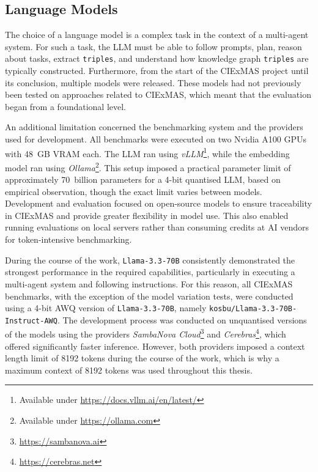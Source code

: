 \documentclass[a4paper,oneside,bibliography=totoc]{scrbook}
\begin{document}
\subsection{Language Models}
\label{subsec:eval_language_models}

The choice of a language model is a complex task in the context of a multi-agent system. For such a task, the \ac{LLM} must be able to follow prompts, plan, reason about tasks, extract \texttt{triples}, and understand how knowledge graph \texttt{triples} are typically constructed. Furthermore, from the start of the CIExMAS project until its conclusion, multiple models were released. These models had not previously been tested on approaches related to CIExMAS, which meant that the evaluation began from a foundational level.

An additional limitation concerned the benchmarking system and the providers used for development. All benchmarks were executed on two Nvidia A100 GPUs with 48~GB VRAM each. The \ac{LLM} ran using \textit{vLLM}\footnote{Available under \url{https://docs.vllm.ai/en/latest/}}, while the embedding model ran using \textit{Ollama}\footnote{Available under \url{https://ollama.com}}. This setup imposed a practical parameter limit of approximately 70~billion parameters for a 4-bit quantised \ac{LLM}, based on empirical observation, though the exact limit varies between models. Development and evaluation focused on open-source models to ensure traceability in CIExMAS and provide greater flexibility in model use. This also enabled running evaluations on local servers rather than consuming credits at AI vendors for token-intensive benchmarking.

During the course of the work, \texttt{Llama-3.3-70B} consistently demonstrated the strongest performance in the required capabilities, particularly in executing a multi-agent system and following instructions. For this reason, all CIExMAS benchmarks, with the exception of the model variation tests, were conducted using a 4-bit AWQ version of \texttt{Llama-3.3-70B}, namely \texttt{kosbu/Llama-3.3-70B-Instruct-AWQ}. The development process was conducted on unquantised versions of the models using the providers \textit{SambaNova Cloud}\footnote{\url{https://sambanova.ai}} and \textit{Cerebras}\footnote{\url{https://cerebras.net}}, which offered significantly faster inference. However, both providers imposed a context length limit of 8192 tokens during the course of the work, which is why a maximum context of 8192 tokens was used throughout this thesis.
\end{document}

